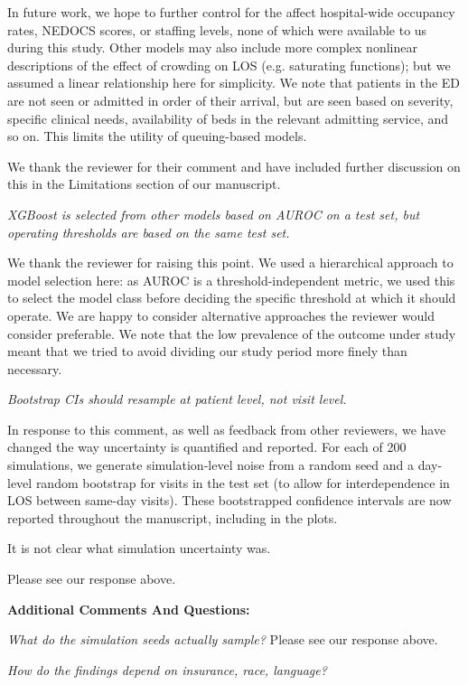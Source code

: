 In future work, we hope to further control for the affect hospital-wide occupancy rates, NEDOCS scores, or staffing levels, none of which were available to us during this study. Other models may also include more complex nonlinear descriptions of the effect of crowding on LOS (e.g. saturating functions); but we assumed a linear relationship here for simplicity. We note that patients in the ED are not seen or admitted in order of their arrival, but are seen based on severity, specific clinical needs, availability of beds in the relevant admitting service, and so on. This limits the utility of queuing-based models.

We thank the reviewer for their comment and have included further discussion on this in the Limitations section of our manuscript.

\textit{     XGBoost is selected from other models based on AUROC on a test set, but operating thresholds are based on the same test set.}

We thank the reviewer for raising this point. We used a hierarchical approach to model selection here: as AUROC is a threshold-independent metric, we used this to select the model class before deciding the specific threshold at which it should operate. We are happy to consider alternative approaches the reviewer would consider preferable. We note that the low prevalence of the outcome under study meant that we tried to avoid dividing our study period more finely than necessary.

\textit{     Bootstrap CIs should resample at patient level, not visit level.}

In response to this comment, as well as feedback from other reviewers, we have changed the way uncertainty is quantified and reported. For each of 200 simulations, we generate simulation-level noise from a random seed and a day-level random bootstrap for visits in the test set (to allow for interdependence in LOS between same-day visits). These bootstrapped confidence intervals are now reported throughout the manuscript, including in the plots.

     It is not clear what simulation uncertainty was.

Please see our response above.

\textbf{Additional Comments And Questions:}


\textit{     What do the simulation seeds actually sample?}
Please see our response above.
 
\textit{     How do the findings depend on insurance, race, language?}


